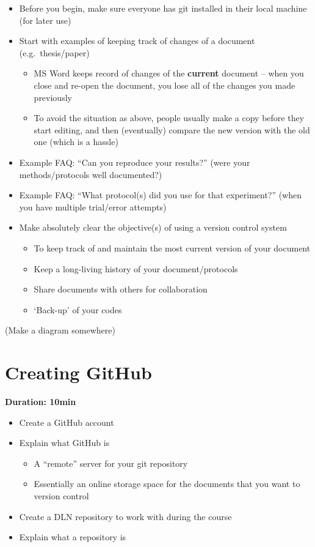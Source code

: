 \documentclass[a4paper, 12pt, oneside]{report} %
\begin{document}
\begin{itemize}
	\item Before you begin, make sure everyone has git installed in their local machine (for later use)
	\item Start with examples of keeping track of changes of a document (e.g.\ thesis/paper)
		\begin{itemize}
			\item MS Word keeps record of changes of the {\bfseries current} document -- when you close and re-open the document, you lose all of the changes you made previously
			\item To avoid the situation as above, people usually make a copy before they start editing, and then (eventually) compare the new version with the old one (which is a hassle)
		\end{itemize}
	\item Example FAQ: ``Can you reproduce your results?'' (were your methods/protocols well documented?)
	\item Example FAQ: ``What protocol(s) did you use for that experiment?'' (when you have multiple trial/error attempts)
	\item Make absolutely clear the objective(s) of using a version control system
		\begin{itemize}
			\item To keep track of and maintain the most current version of your document
			\item Keep a long-living history of your document/protocols
			\item Share documents with others for collaboration
			\item `Back-up' of your codes
		\end{itemize}
\end{itemize}

(Make a diagram somewhere)


\section{Creating GitHub}
\label{sec:creating_github}

{\bfseries Duration: 10min}

\begin{itemize}
	\item Create a GitHub account
	\item Explain what GitHub is
		\begin{itemize}
			\item A ``remote'' server for your git repository
			\item Essentially an online storage space for the documents that you want to version control
		\end{itemize}
	\item Create a DLN repository to work with during the course
	\item Explain what a repository is
\end{itemize}
\end{document}
